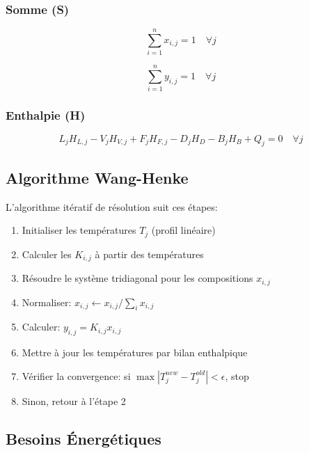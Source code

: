 \documentclass[11pt,a4paper]{article}
\begin{document}
\subsubsection{Somme (S)}

\begin{equation}
\sum_{i=1}^{n} x_{i,j} = 1 \quad \forall j
\end{equation}

\begin{equation}
\sum_{i=1}^{n} y_{i,j} = 1 \quad \forall j
\end{equation}

\subsubsection{Enthalpie (H)}

\begin{equation}
L_j H_{L,j} - V_j H_{V,j} + F_j H_{F,j} - D_j H_D - B_j H_B + Q_j = 0 \quad \forall j
\end{equation}

\subsection{Algorithme Wang-Henke}

L'algorithme itératif de résolution suit ces étapes:

\begin{enumerate}[leftmargin=*]
    \item Initialiser les températures $T_j$ (profil linéaire)
    \item Calculer les $K_{i,j}$ à partir des températures
    \item Résoudre le système tridiagonal pour les compositions $x_{i,j}$
    \item Normaliser: $x_{i,j} \leftarrow x_{i,j}/\sum_i x_{i,j}$
    \item Calculer: $y_{i,j} = K_{i,j} x_{i,j}$
    \item Mettre à jour les températures par bilan enthalpique
    \item Vérifier la convergence: si $\max|T_j^{new} - T_j^{old}| < \epsilon$, stop
    \item Sinon, retour à l'étape 2
\end{enumerate}

\subsection{Besoins Énergétiques}
\end{document}
